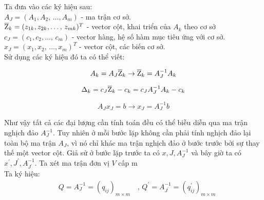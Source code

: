 \documentclass{article}
\begin{document}
\begin{enumerate}
                        Ta đưa vào các ký hiệu sau: \\
                         $A_J=(A_1,A_2,\,\ldots,A_m)$ - ma trận cơ sở. \\
                        $\overline{\rm Z}_k = (z_{1k},z_{2k},\ldots,\,z_{mk})^T$ - vector cột, khai triển của $A_k$ theo cơ sở \\
                        $c_J = (c_1,c_2,\ldots,\,c_m)$ - vector hàng, hệ số hàm mục     tiêu ứng với cơ sở. \\
                        $x_J=(x_1,x_2,\,\ldots,x_m)^T$ - vector cột, các biến cơ sở. \\
                        Sử dụng các ký hiệu đó ta có thể viết: \\
                        \begin{center}
                        \begin{equation} \label{1}
                            A_k = A_J \overline{\rm Z}_k \rightarrow \overline{\rm Z}_k = A_J^{-1}A_k
                        \end{equation}
                        \end{center}    
                        \begin{center}
                        \begin{equation} \label{2}
                            \Delta_k = c_J\overline{\rm Z}_k - c_k = c_{J}A_J^{-1}A_k - c_k
                        \end{equation}
                        \end{center}
                        \begin{center}
                        \begin{equation} \label{3}
                            A_{J}x_J = b \rightarrow x_J=A_J^{-1}b
                        \end{equation}
                        \end{center}   
                        Như vậy tất cả các đại lượng cần tính toán đều có thể biễu diễn qua ma trận nghịch đảo $A_J^{-1}$. Tuy nhiên ở mỗi bước lặp không cần phải tính nghịch đảo lại toàn bộ ma trận $A_J$, vì nó chỉ khác ma trận nghịch đảo ở bước trước bởi sự thay thế một vector cột. Giả sử ở bước lặp trước ta có $x,J,A_J^{-1}$ và bây giờ ta có $x^{'},J^{'},A_{J^{'}}^{-1}$. Ta xét ma trận đơn vị $V$ cấp m\\
                        Ta ký hiệu:
                            \begin{align*}
                                        \quad Q = A_J^{-1} = (q_{ij})_{m \times m} \quad ,\,Q^{'} = A_{J^{'}}^{-1} = (q^{'}_{ij})_{m \times m}

\end{align*}
\end{enumerate}
\end{document}
